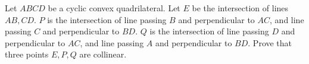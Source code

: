 Let $ABCD$ be a cyclic convex quadrilateral. Let $E$ be the intersection of lines $AB,CD$. $P$ is the intersection
of line passing $B$ and perpendicular to $AC$, and line passing $C$ and perpendicular to $BD$. $Q$ is the intersection
of line passing $D$ and perpendicular to $AC$, and line passing $A$ and perpendicular to $BD$. Prove that three
points $E, P,Q$ are collinear.